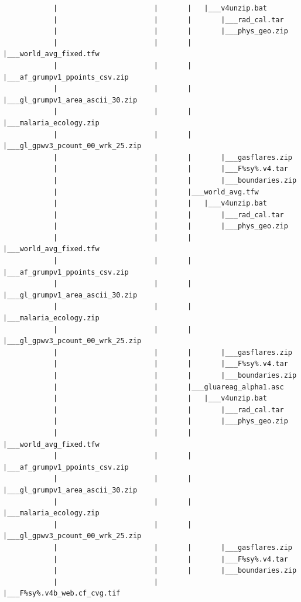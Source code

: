 \documentclass[
]{book}
\begin{document}
\begin{verbatim}
            |                       |       |   |___v4unzip.bat
            |                       |       |       |___rad_cal.tar
            |                       |       |       |___phys_geo.zip
            |                       |       |       |___world_avg_fixed.tfw
            |                       |       |       |___af_grumpv1_ppoints_csv.zip
            |                       |       |       |___gl_grumpv1_area_ascii_30.zip
            |                       |       |       |___malaria_ecology.zip
            |                       |       |       |___gl_gpwv3_pcount_00_wrk_25.zip
            |                       |       |       |___gasflares.zip
            |                       |       |       |___F%sy%.v4.tar
            |                       |       |       |___boundaries.zip
            |                       |       |___world_avg.tfw
            |                       |       |   |___v4unzip.bat
            |                       |       |       |___rad_cal.tar
            |                       |       |       |___phys_geo.zip
            |                       |       |       |___world_avg_fixed.tfw
            |                       |       |       |___af_grumpv1_ppoints_csv.zip
            |                       |       |       |___gl_grumpv1_area_ascii_30.zip
            |                       |       |       |___malaria_ecology.zip
            |                       |       |       |___gl_gpwv3_pcount_00_wrk_25.zip
            |                       |       |       |___gasflares.zip
            |                       |       |       |___F%sy%.v4.tar
            |                       |       |       |___boundaries.zip
            |                       |       |___gluareag_alpha1.asc
            |                       |       |   |___v4unzip.bat
            |                       |       |       |___rad_cal.tar
            |                       |       |       |___phys_geo.zip
            |                       |       |       |___world_avg_fixed.tfw
            |                       |       |       |___af_grumpv1_ppoints_csv.zip
            |                       |       |       |___gl_grumpv1_area_ascii_30.zip
            |                       |       |       |___malaria_ecology.zip
            |                       |       |       |___gl_gpwv3_pcount_00_wrk_25.zip
            |                       |       |       |___gasflares.zip
            |                       |       |       |___F%sy%.v4.tar
            |                       |       |       |___boundaries.zip
            |                       |       |___F%sy%.v4b_web.cf_cvg.tif

\end{verbatim}
\end{document}
